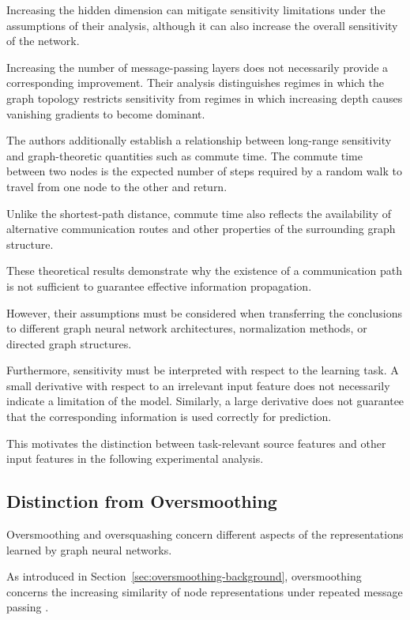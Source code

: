 \documentclass[english]{lni}
\begin{document}
Increasing the hidden dimension can mitigate sensitivity
limitations under the assumptions of their analysis, although
it can also increase the overall sensitivity of the network.

Increasing the number of message-passing layers does not
necessarily provide a corresponding improvement. Their
analysis distinguishes regimes in which the graph topology
restricts sensitivity from regimes in which increasing
depth causes vanishing gradients to become dominant.

The authors additionally establish a relationship between
long-range sensitivity and graph-theoretic quantities such
as commute time. The commute time between two nodes is the
expected number of steps required by a random walk to travel
from one node to the other and return.

Unlike the shortest-path distance, commute time also
reflects the availability of alternative communication
routes and other properties of the surrounding graph
structure.

These theoretical results demonstrate why the existence
of a communication path is not sufficient to guarantee
effective information propagation.

However, their assumptions must be considered when
transferring the conclusions to different graph neural
network architectures, normalization methods, or directed
graph structures.

Furthermore, sensitivity must be interpreted with respect
to the learning task. A small derivative with respect to
an irrelevant input feature does not necessarily indicate
a limitation of the model. Similarly, a large derivative
does not guarantee that the corresponding information is
used correctly for prediction.

This motivates the distinction between task-relevant
source features and other input features in the following
experimental analysis.

\subsection{Distinction from Oversmoothing}
\label{sec:oversquashing-vs-oversmoothing}

Oversmoothing and oversquashing concern different aspects
of the representations learned by graph neural networks.

As introduced in
Section~\ref{sec:oversmoothing-background}, oversmoothing
concerns the increasing similarity of node representations
under repeated message passing
\cite{rusch2023oversmoothing}.
\end{document}

